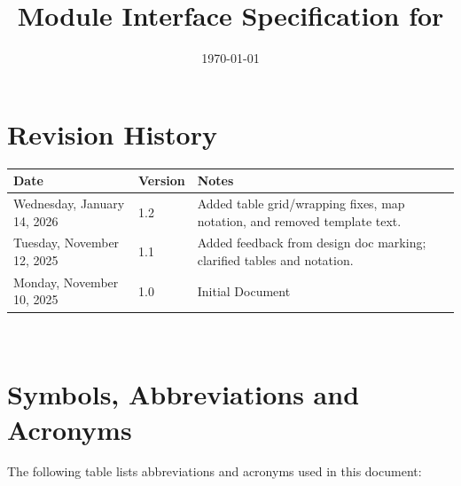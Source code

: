 \documentclass[12pt, titlepage]{article}
\begin{document}
\title{Module Interface Specification for \progname{}}

\author{\authname}

\date{\today}

\maketitle


\section{Revision History}

\begin{tabularx}{\textwidth}{p{3cm}p{2cm}X}
\toprule {\bf Date} & {\bf Version} & {\bf Notes}\\
\midrule
Wednesday, January 14, 2026 & 1.2 & Added table grid/wrapping fixes, map notation, and removed template text.\\
Tuesday, November 12, 2025 & 1.1 & Added feedback from design doc marking; clarified tables and notation.\\
Monday, November 10, 2025 & 1.0 & Initial Document\\
\bottomrule
\end{tabularx}

~\newpage

\section{Symbols, Abbreviations and Acronyms}

The following table lists abbreviations and acronyms used in this document:
\end{document}
